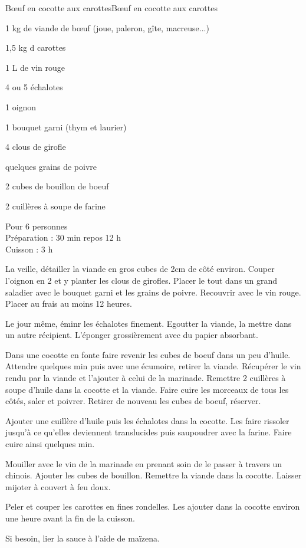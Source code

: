 \begin{recette}{Bœuf en cocotte aux carottes}{Bœuf en cocotte aux carottes}

\begin{ingredients}
1 kg de viande de bœuf (joue, paleron, gîte, macreuse...)\par
1,5 kg d carottes\par
1 L de vin rouge\par
4 ou 5 échalotes\par
1 oignon\par
1 bouquet garni (thym et laurier)\par
4 clous de girofle\par
quelques grains de poivre\par
2 cubes de bouillon de boeuf\par
2 cuillères à soupe de farine\par
\end{ingredients}

\begin{infos}
Pour 6 personnes		\\
Préparation : 30 min repos 12 h		\\
Cuisson : 3 h			\\
\end{infos}

\begin{etapes}
\item La veille, détailler la viande en gros cubes de 2cm de côté environ. Couper l'oignon en 2 et y planter les clous de girofles. Placer le tout dans un grand saladier avec le bouquet garni et les grains de poivre. Recouvrir avec le vin rouge. Placer au frais au moins 12 heures.
\item Le jour même, éminr les échalotes finement. Egoutter la viande, la mettre dans un autre récipient. L'éponger grossièrement avec du papier absorbant.
\item Dans une cocotte en fonte faire revenir les cubes de boeuf dans un peu d'huile. Attendre quelques min puis avec une écumoire, retirer la viande. Récupérer le vin rendu par la viande et l'ajouter à celui de la marinade. Remettre 2 cuillères à soupe d'huile dans la cocotte et la viande. Faire cuire les morceaux de tous les côtés, saler et poivrer. Retirer de nouveau les cubes de boeuf, réserver.
\item Ajouter une cuillère d'huile puis les échalotes dans la cocotte. Les faire rissoler jusqu'à ce qu'elles deviennent translucides puis saupoudrer avec la farine. Faire cuire ainsi quelques min.
\item Mouiller avec le vin de la marinade en prenant soin de le passer à travers un chinois. Ajouter les cubes de bouillon. Remettre la viande dans la cocotte. Laisser mijoter à couvert à feu doux.
\item Peler et couper les carottes en fines rondelles. Les ajouter dans la cocotte environ une heure avant la fin de la cuisson.
\item Si besoin, lier la sauce à l'aide de maïzena.
\end{etapes}


\end{recette}
